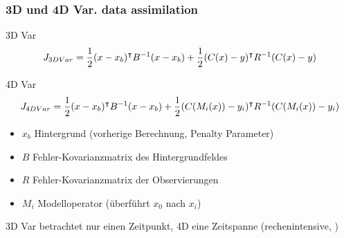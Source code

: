 \appendix
{}
\setcounter{finalframe}{\value{framenumber}}

\begin{frame}
\frametitle{3D und 4D Var. data assimilation}

\begin{block}{3D Var}
 \[J_{3DVar} = \frac{1}{2}(x-x_b)^\intercal B^{-1} (x-x_b) +  \frac{1}{2} (C(x) -y)^\intercal R^{-1}(C(x) -y)\]
\end{block}
\begin{block}{4D Var}
\[J_{4DVar} = \frac{1}{2}(x-x_b)^\intercal B^{-1} (x-x_b) + \frac{1}{2} (C(M_i(x)) -y_i)^\intercal R^{-1}(C(M_i(x)) -y_i)\]
\end{block}
\begin{itemize}
\item $x_b$ Hintergrund (vorherige Berechnung, Penalty Parameter)
 \item $B$ Fehler-Kovarianzmatrix des Hintergrundfeldes
 \item $R$ Fehler-Kovarianzmatrix der Observierungen
 \item $M_i$ Modelloperator (überführt $x_0$ nach $x_i$)
\end{itemize}
3D Var betrachtet nur einen Zeitpunkt, 4D eine Zeitspanne (rechenintensive, \cite{huang2003introduction})
\end{frame}

